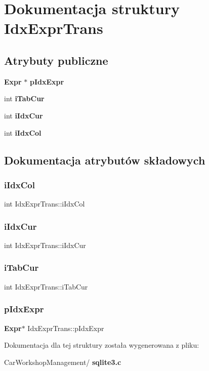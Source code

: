\section{Dokumentacja struktury Idx\+Expr\+Trans}
\label{struct_idx_expr_trans}
\subsection*{Atrybuty publiczne}
\begin{DoxyCompactItemize}
\item 
\textbf{ Expr} $\ast$ \textbf{ p\+Idx\+Expr}
\item 
int \textbf{ i\+Tab\+Cur}
\item 
int \textbf{ i\+Idx\+Cur}
\item 
int \textbf{ i\+Idx\+Col}
\end{DoxyCompactItemize}


\subsection{Dokumentacja atrybutów składowych}
\mbox{\label{struct_idx_expr_trans_a77adde7e18ae779eda583eee8335ca4d}} 
\subsubsection{iIdxCol}
{\footnotesize\ttfamily int Idx\+Expr\+Trans\+::i\+Idx\+Col}

\mbox{\label{struct_idx_expr_trans_a4ada73eae908aab2357d21285cf57a1f}} 
\subsubsection{iIdxCur}
{\footnotesize\ttfamily int Idx\+Expr\+Trans\+::i\+Idx\+Cur}

\mbox{\label{struct_idx_expr_trans_afa7174674b23ddeaac54bb7eb24f2ffd}} 
\subsubsection{iTabCur}
{\footnotesize\ttfamily int Idx\+Expr\+Trans\+::i\+Tab\+Cur}

\mbox{\label{struct_idx_expr_trans_aad1ac82821587a903b325e7a3c41b9f8}} 
\subsubsection{pIdxExpr}
{\footnotesize\ttfamily \textbf{ Expr}$\ast$ Idx\+Expr\+Trans\+::p\+Idx\+Expr}



Dokumentacja dla tej struktury została wygenerowana z pliku\+:\begin{DoxyCompactItemize}
\item 
Car\+Workshop\+Management/\textbf{ sqlite3.\+c}\end{DoxyCompactItemize}
